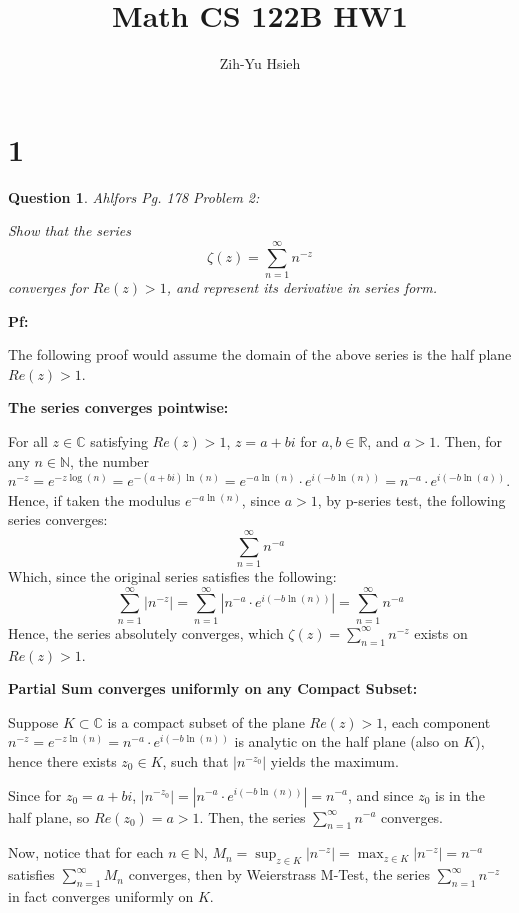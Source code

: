 \documentclass{article}
\title{Math CS 122B HW1}
\author{Zih-Yu Hsieh}
\newtheorem{question}{Question}
\begin{document}
\maketitle

\section*{1}
\begin{myBox}[]{}
    \begin{question}
        Ahlfors Pg. 178 Problem 2:

        Show that the series
        $$\zeta(z)=\sum_{n=1}^{\infty}n^{-z}$$
        converges for $Re(z)>1$, and represent its derivative in series form.
    \end{question}
\end{myBox}

\textbf{Pf:}

The following proof would assume the domain of the above series is the half plane $Re(z)>1$.

\hfil

\textbf{The series converges pointwise:}

For all $z\in\mathbb{C}$ satisfying $Re(z)>1$, $z=a+bi$ for $a,b\in\mathbb{R}$, and $a>1$. Then, for any $n\in\mathbb{N}$,
the number $n^{-z}=e^{-z\log(n)} = e^{-(a+bi)\ln(n)} = e^{-a\ln(n)}\cdot e^{i(-b\ln(n))} = n^{-a}\cdot e^{i(-b\ln(a))}$. Hence, if taken the modulus $e^{-a\ln(n)}$,
since $a>1$, by p-series test, the following series converges:
$$\sum_{n=1}^{\infty}n^{-a}$$
Which, since the original series satisfies the following:
$$\sum_{n=1}^{\infty}|n^{-z}| = \sum_{n=1}^{\infty}\left|n^{-a}\cdot e^{i(-b\ln(n))}\right| = \sum_{n=1}^{\infty}n^{-a}$$
Hence, the series absolutely converges, which $\zeta(z)=\sum_{n=1}^{\infty}n^{-z}$ exists on $Re(z)>1$.

\hfil

\textbf{Partial Sum converges uniformly on any Compact Subset:}

Suppose $K\subset \mathbb{C}$ is a compact subset of the plane $Re(z)>1$, each component $n^{-z}=e^{-z\ln(n)}=n^{-a}\cdot e^{i(-b\ln(n))}$ is analytic on the half plane (also on $K$), 
hence there exists $z_0\in K$, such that $|n^{-z_0}|$ yields the maximum.

Since for $z_0=a+bi$, $|n^{-z_0}|=\left|n^{-a}\cdot e^{i(-b\ln(n))}\right|=n^{-a}$, and since $z_0$ is in the half plane, so $Re(z_0)=a>1$. Then, the series $\sum_{n=1}^{\infty}n^{-a}$ converges.

Now, notice that for each $n\in\mathbb{N}$, $M_n=\sup_{z\in K}|n^{-z}| = \max_{z\in K}|n^{-z}|=n^{-a}$ satisfies $\sum_{n=1}^{\infty}M_n$ converges, then by Weierstrass M-Test,
the series $\sum_{n=1}^{\infty}n^{-z}$ in fact converges uniformly on $K$. 
\end{document}
